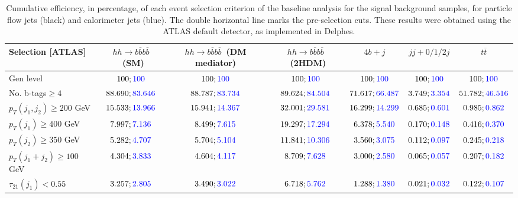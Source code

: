 \begin{landscape}
	\begin{table}
		\centering
		\caption{Cumulative efficiency, in percentage, of each event selection criterion of the baseline analysis for the signal background samples, for particle flow jets (black) and calorimeter jets (blue). The double horizontal line marks the pre-selection cuts. These results were obtained using the ATLAS default detector, as implemented in Delphes.}
		\begin{tabular}{lcccccc}
			\toprule 
			\textbf{Selection [ATLAS]} & $hh\rightarrow b\overline{b}b\overline{b}$~(SM) & $hh\rightarrow b\overline{b}b\overline{b}$~(DM mediator) & $hh\rightarrow b\overline{b}b\overline{b}$~(2HDM) & $4b+j$  & $jj+0/1/2 j$ & $t\overline{t}$ \\
			\midrule
			Gen level & $100;\textcolor{blue}{100}$ & $100;\textcolor{blue}{100}$ &$100;\textcolor{blue}{100}$& $100;\textcolor{blue}{100}$& $100;\textcolor{blue}{100}$& $100;\textcolor{blue}{100}$ \\
			\rowcolor{black!7}No. b-tags$\geq 4$&$88.690;\textcolor{blue}{83.646}$&$88.787;\textcolor{blue}{83.734}$&$89.624;\textcolor{blue}{84.504}$&$71.617;\textcolor{blue}{66.487}$&$3.749;\textcolor{blue}{3.354}$&$51.782;\textcolor{blue}{46.516}$\\
			$p_T(j_1,j_2)\geq200$ GeV & $15.533;\textcolor{blue}{13.966}$ & $15.941;\textcolor{blue}{14.367}$&$32.001;\textcolor{blue}{29.581}$ &$16.299;\textcolor{blue}{14.299}$&$0.685;\textcolor{blue}{0.601}$&$0.985;\textcolor{blue}{0.862}$\\ 
			\midrule \midrule
			\rowcolor{black!7}$p_T(j_1)\geq 400$ GeV & $7.997;\textcolor{blue}{7.136}$ &$8.499;\textcolor{blue}{7.615}$  &$19.297;\textcolor{blue}{17.294}$&$6.378;\textcolor{blue}{5.540}$&$0.170;\textcolor{blue}{0.148}$&$0.416;\textcolor{blue}{0.370}$\\ 
			$p_T(j_2)\geq 350$ GeV & $5.282;\textcolor{blue}{4.707}$& $5.704;\textcolor{blue}{5.104}$&$11.841;\textcolor{blue}{10.306}$&$3.560;\textcolor{blue}{3.075}$&$0.112;\textcolor{blue}{0.097}$&$0.245;\textcolor{blue}{0.218}$\\
			\rowcolor{black!7}$p_T(j_1+j_2)\geq 100$ GeV &$4.304;\textcolor{blue}{3.833}$ & $4.604;\textcolor{blue}{4.117}$ &$8.709;\textcolor{blue}{7.628}$&$3.000;\textcolor{blue}{2.580}$&$0.065;\textcolor{blue}{0.057}$&$0.207;\textcolor{blue}{0.182}$\\
			$\tau_{21}(j_1)<0.55$ & $3.257;\textcolor{blue}{2.805}$& $3.490;\textcolor{blue}{3.022}$&$6.718;\textcolor{blue}{5.762}$&$1.288;\textcolor{blue}{1.380}$&$0.021;\textcolor{blue}{0.032}$&$0.122;\textcolor{blue}{0.107}$\\

\end{tabular}
\end{table}
\end{landscape}
